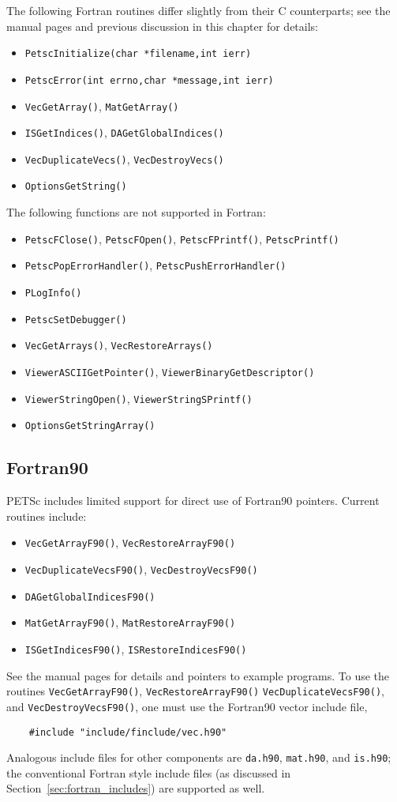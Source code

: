 {The following Fortran routines differ slightly from their C counterparts; see the 
manual pages and previous discussion in this chapter for details:
\begin{itemize}
\item {\tt PetscInitialize(char *filename,int ierr)}
\item {\tt PetscError(int errno,char *message,int ierr)}
\item {\tt VecGetArray()}, {\tt MatGetArray()}
\item {\tt ISGetIndices()}, {\tt DAGetGlobalIndices()}
\item {\tt VecDuplicateVecs()}, {\tt VecDestroyVecs()}
\item {\tt OptionsGetString()}
\end{itemize}
The following functions are not supported in Fortran:
\begin{itemize}
\item {\tt PetscFClose()}, {\tt PetscFOpen()}, {\tt PetscFPrintf()}, {\tt PetscPrintf()}
\item {\tt PetscPopErrorHandler()}, {\tt PetscPushErrorHandler()}
\item {\tt PLogInfo()}
\item {\tt PetscSetDebugger()}
\item {\tt VecGetArrays()}, {\tt VecRestoreArrays()}
\item {\tt ViewerASCIIGetPointer()}, {\tt ViewerBinaryGetDescriptor()}
\item {\tt ViewerStringOpen()}, {\tt ViewerStringSPrintf()}
\item {\tt OptionsGetStringArray()}
\end{itemize}

\subsection{Fortran90}

PETSc includes limited support for direct use of Fortran90 pointers.
Current routines include:
\begin{itemize}
\item {\tt VecGetArrayF90()}, {\tt VecRestoreArrayF90()}
\item {\tt VecDuplicateVecsF90()}, {\tt VecDestroyVecsF90()}
\item {\tt DAGetGlobalIndicesF90()}
\item {\tt MatGetArrayF90()}, {\tt MatRestoreArrayF90()}
\item {\tt ISGetIndicesF90()}, {\tt ISRestoreIndicesF90()}
\end{itemize}
See the manual pages for details and pointers to example programs.  To
use the routines {\tt VecGetArrayF90()}, {\tt VecRestoreArrayF90()}
{\tt VecDuplicateVecsF90()}, and {\tt VecDestroyVecsF90()}, one must
use the Fortran90 vector include file,
\begin{verbatim}
    #include "include/finclude/vec.h90"
\end{verbatim}
Analogous include files for other components are {\tt da.h90},
{\tt mat.h90}, and {\tt is.h90}; the conventional Fortran style
include files (as discussed in Section~\ref{sec:fortran_includes})
are supported as well.

}
